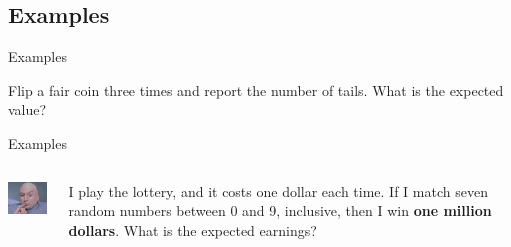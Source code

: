 



    




\subsection{Examples}

\begin{frame}{Examples}

  Flip a fair coin three times and report the number of tails. What is
  the expected value?
  
\end{frame}

\begin{frame}{Examples}

   \begin{columns}
     \includegraphics[width=7em]{img/dr_evil_one_million_dollars}

     I play the lottery, and it costs one dollar each time. If I match
     seven random numbers between 0 and 9, inclusive, then I win
     \textbf{one million dollars}. What is the expected earnings?
   \end{columns}
  
\end{frame}

